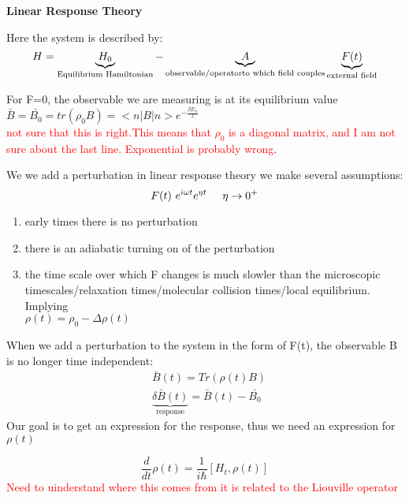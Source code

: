 \documentclass{article}
\begin{document}
\setlength{\parindent}{0pt}

\textbf{Linear Response Theory}

\vspace{5mm}

Here the system is described by:
\begin{equation}
	H=\underbrace{H_0}_{\text{Equilibrium Hamiltonian}}-\underbrace{A}_{\text{observable/operator\\ to which field couples}}\underbrace{F(t)}_{\text{external field}}
\end{equation}

For F=0, the observable we are measuring is at its equilibrium value $\bar{B}=\bar{B_0}=tr(\rho_0 B)=<n|B|n>e^{-\frac{\beta E_n}{z}}$\\
\textcolor{red}{not sure that this is right.This means that $\rho_0$ is a diagonal matrix, and I am not sure about the last line. Exponential is probably wrong}.

\vspace{5mm}

We we add a perturbation in linear response theory we make several assumptions:
\begin{equation}
F(t)~e^{i\omega t} e^{\eta t} \hspace{5mm} \eta \rightarrow 0^+
\end{equation}
\begin{enumerate}
	\item early times there is no perturbation
	\item there is an adiabatic turning on of the perturbation
	\item the time scale over which F changes is much slowler than the microscopic timescales/relaxation times/molecular collision times/local equilibrium. Implying\\
	$\rho(t)=\rho_0-\Delta\rho(t)$
\end{enumerate}
When we add a perturbation to the system in the form of F(t), the observable B is no longer time independent:
\begin{align}
& \bar{B}(t)=Tr(\rho(t)B)\\
&\underbrace{\delta\bar{B}(t)}_{\text{response}}=\bar{B}(t)-\bar{B_0}
\end{align}
Our goal is to get an expression for the response, thus we need an expression for $\rho(t)$

\begin{equation}
\frac{d}{dt}\rho(t)=\frac{1}{i\hbar}[H_t,\rho(t)]
\end{equation}
\textcolor{red}{Need to uinderstand where this comes from it is related to the Liouville operator}
\end{document}
